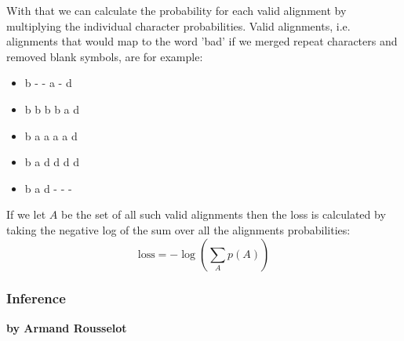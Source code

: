 \documentclass{article}
\begin{document}
With that we can calculate the probability for each valid alignment by multiplying the individual character probabilities. Valid alignments, i.e. alignments that would map to the word 'bad' if we merged repeat characters and removed blank symbols, are for example:
\begin{itemize}
\item b - - a - d
\item b b b b a d 
\item b a a a a d 
\item b a d d d d 
\item b a d - - -
\end{itemize}
If we let \(A\) be the set of all such valid alignments then the loss is calculated by taking the negative log of the sum over all the alignments probabilities:\\
\[
\text{loss} = -\log\left(\sum_A p(A)\right)
\]
\subsubsection{Inference}

\textbf{by Armand Rousselot} \\
\end{document}
